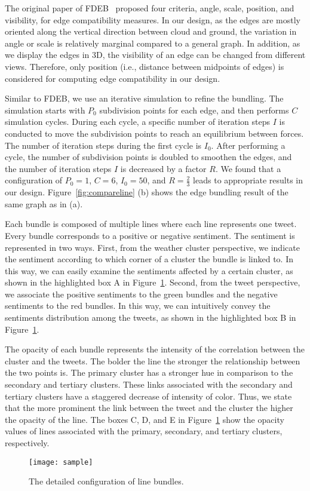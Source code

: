 The original paper of FDEB~\cite{holten2009force} proposed four criteria, angle, scale, position, and visibility, for edge compatibility measures. In our design, as the edges are mostly oriented along the vertical direction between cloud and ground, the variation in angle or scale is relatively marginal compared to a general graph. In addition, as we display the edges in 3D, the visibility of an edge can be changed from different views. Therefore, only position (i.e., distance between midpoints of edges) is considered for computing edge compatibility in our design.

Similar to FDEB, we use an iterative simulation to refine the bundling. The simulation starts with $P_0$ subdivision points for each edge, and then performs $C$ simulation cycles. During each cycle, a specific number of iteration steps $I$ is conducted to move the subdivision points to reach an equilibrium between forces. The number of iteration steps during the first cycle is $I_0$. After performing a cycle, the number of subdivision points is doubled to smoothen the edges, and the number of iteration steps $I$ is decreased by a factor $R$. We found that a configuration of $P_0=1$, $C=6$, $I_0=50$, and $R=\frac{2}{3}$ leads to appropriate results in our design. Figure~\ref{fig:compareline} (b) shows the edge bundling result of the same graph as in (a).  

Each bundle is composed of multiple lines where each line represents one tweet. Every bundle corresponds to a positive or negative sentiment. The sentiment is represented in two ways. First, from the weather cluster perspective, we indicate the sentiment according to which corner of a cluster the bundle is linked to. In this way, we can easily examine the sentiments affected by a certain cluster, as shown in the highlighted box A in Figure~\ref{fig:linedetail}. Second, from the tweet perspective, we associate the positive sentiments to the green bundles and the negative sentiments to the red bundles. In this way, we can intuitively convey the sentiments distribution among the tweets, as shown in the highlighted box B in Figure~\ref{fig:linedetail}.

The opacity of each bundle represents the intensity of the correlation between the cluster and the tweets. The bolder the line the stronger the relationship between the two points is. The primary cluster has a stronger hue in comparison to the secondary and tertiary clusters. These links associated with the secondary and tertiary clusters have a staggered decrease of intensity of color. Thus, we state that the more prominent the link between the tweet and the cluster the higher the opacity of the line. The boxes C, D, and E in Figure~\ref{fig:linedetail} show the opacity values of lines associated with the primary, secondary, and tertiary clusters, respectively.

\begin{figure}[t]
\begin{center}
\texttt{[image: sample]} 
\end{center}
\vspace{-.1in}
\caption{The detailed configuration of line bundles.}
\label{fig:linedetail}
\end{figure}
